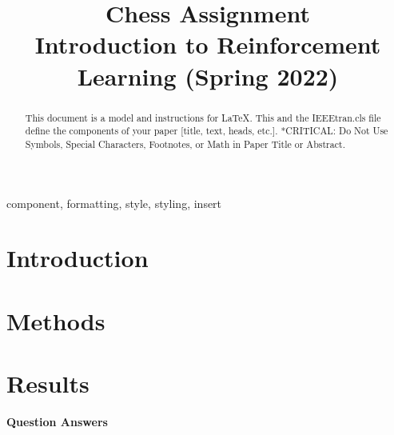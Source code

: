 \documentclass[conference]{IEEEtran}
\begin{document}
\title{Chess Assignment\\
{\footnotesize Introduction to Reinforcement Learning (Spring 2022)}
}

\author{
}

\maketitle

\begin{abstract}
    \color{red}
    This document is a model and instructions for \LaTeX.
    This and the IEEEtran.cls file define the components of your paper [title, text, heads, etc.]. *CRITICAL: Do Not Use Symbols, Special Characters, Footnotes, 
    or Math in Paper Title or Abstract.
\end{abstract}

\begin{IEEEkeywords}
    \color{red}
    component, formatting, style, styling, insert
\end{IEEEkeywords}



\section{Introduction}

\section{Methods}

\section{Results}


\textbf{Question Answers}
\end{document}
